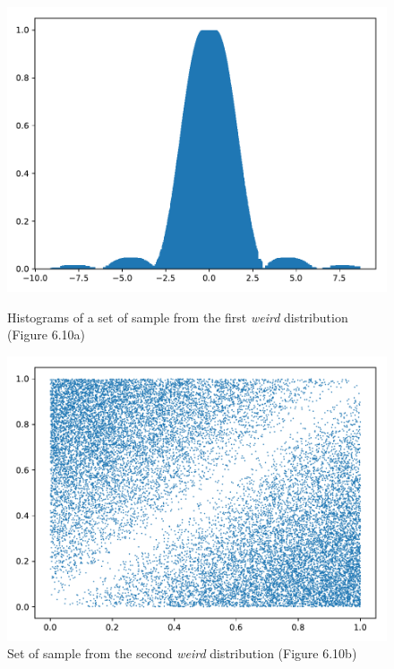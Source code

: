 \documentclass[11pt,a4paper]{article}
\begin{document}
\begin{figure}[ht]
	\centering
	\begin{minipage}{0.45\textwidth}
		\centering
		\includegraphics[width=\textwidth]{fig-6_10a}
		\caption{Histograms of a set of sample from the first \textit{weird} distribution (Figure 6.10a)}
		\label{fig:6_10a}
	\end{minipage}
	\begin{minipage}{0.45\textwidth}
		\centering
		\includegraphics[width=\textwidth]{fig-6_10b}
		\caption{Set of sample from the second \textit{weird} distribution (Figure 6.10b)}
		\label{fig:6_10b}
	\end{minipage}
\end{figure}
\end{document}
